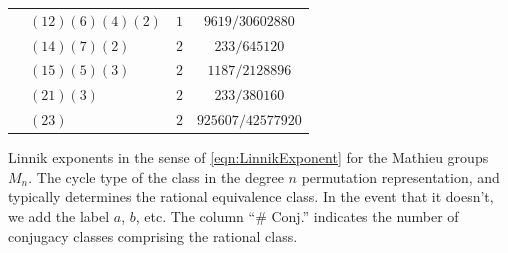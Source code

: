 \documentclass[12pt]{amsart}
\theoremstyle{definition} \newtheorem{definition}[theorem]{Definition}
\theoremstyle{example} \newtheorem{example}[theorem]{Example}
\theoremstyle{remark} \newtheorem{remark}{Remark}[theorem]
\numberwithin{equation}{section}
\numberwithin{theorem}{section}
\begin{document}
{\begin{table}[h]
\begin{minipage}[t]{0.49\textwidth}
\begin{tabular}{|l|l|c|c|}
				& $(12)(6)(4)(2)$ & $1$ & $9619/30602880$ \\
				& $(14)(7)(2)$ & $2$ & $233/645120$ \\
				& $(15)(5)(3)$ & $2$ & $1187/2128896$ \\
				& $(21)(3)$ & $2$ & $233/380160$ \\
				& $(23)$ & $2$ & $925607/42577920$ \\ \hline
		\end{tabular}
		\end{minipage}
		\begin{caption}{\label{tbl:simple-exponents-Mathieu} Linnik exponents in the sense of \eqref{eqn:LinnikExponent} for the Mathieu groups $M_n$.  The cycle type of the class in the degree $n$ permutation representation, and typically determines the rational equivalence class.  In the event that it doesn't, we add the label $a$, $b$, etc.  The column ``$\#$ Conj.'' indicates the number of conjugacy classes comprising the rational class.}\end{caption}
	\end{table}
	}
	
\end{document}
